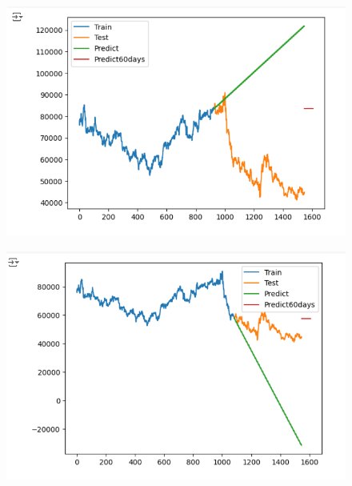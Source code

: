 \documentclass{article}
\begin{document}
\begin{multicols}{2}
\begin{figure}[H]
    \centering
    \begin{minipage}{0.15\textwidth}
    \centering
    \includegraphics[width=1\textwidth]{Image/ARIMA/60_6_4_SAMSUNG_Arima.png}
   
    \label{fig:1}
    \end{minipage}%
    \begin{minipage}{0.15\textwidth}
    \centering
    \includegraphics[width=1\textwidth]{Image/ARIMA/60_7_3_SAMSUNG_Arima.png}
  

\end{minipage}
\end{figure}
\end{multicols}
\end{document}
